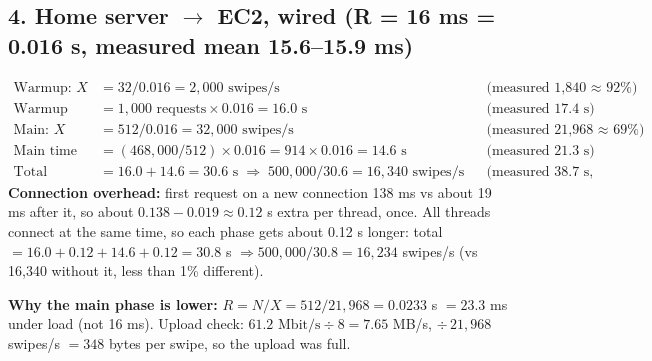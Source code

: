 \documentclass[10pt]{article}
\begin{document}
{\subsection*{4. Home server $\to$ EC2, wired (R = 16 ms = 0.016 s, measured mean 15.6--15.9 ms)}
\begin{align*}
\text{Warmup: } X &= 32 / 0.016 = 2{,}000 \text{ swipes/s} &&\text{(measured 1,840 $\approx$ 92\%)}\\
\text{Warmup time} &= 1{,}000 \text{ requests} \times 0.016 = 16.0 \text{ s} &&\text{(measured 17.4 s)}\\
\text{Main: } X &= 512 / 0.016 = 32{,}000 \text{ swipes/s} &&\text{(measured 21,968 $\approx$ 69\%)}\\
\text{Main time} &= (468{,}000 / 512) \times 0.016 = 914 \times 0.016 = 14.6 \text{ s} &&\text{(measured 21.3 s)}\\
\text{Total} &= 16.0 + 14.6 = 30.6 \text{ s} \;\Rightarrow\; 500{,}000 / 30.6 = 16{,}340 \text{ swipes/s} &&\text{(measured 38.7 s, 12,922/s)}
\end{align*}
\textbf{Connection overhead:} first request on a new connection 138 ms vs about 19 ms after it, so about $0.138 - 0.019 \approx 0.12$ s extra per thread, once. All threads connect at the same time, so each phase gets about 0.12 s longer: total $= 16.0 + 0.12 + 14.6 + 0.12 = 30.8$ s $\Rightarrow 500{,}000 / 30.8 = 16{,}234$ swipes/s (vs 16,340 without it, less than 1\% different).

\textbf{Why the main phase is lower:} $R = N/X = 512 / 21{,}968 = 0.0233$ s $= 23.3$ ms under load (not 16 ms). Upload check: $61.2 \text{ Mbit/s} \div 8 = 7.65$ MB/s, $\div\, 21{,}968$ swipes/s $= 348$ bytes per swipe, so the upload was full.

}
\end{document}

